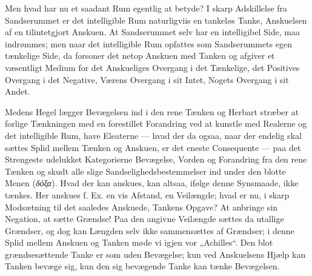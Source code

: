 \documentclass[11pt]{book}
\newcommand{\opage}[1]{\marginnote{\footnotesize\textit{[#1]}}}
\begin{document}
\opage{20} \setcounter{footnote}{0}%
Men hvad har nu et saadant Rum egentlig at betyde? I skarp
Adskillelse fra Sandserummet er det intelligible Rum naturligviis en
tankeløs Tanke, Anskuelsen af en tilintetgjort Anskuen. At
Sandserummet selv har en intelligibel Side, maa indrømmes; men naar
det intelligible Rum opfattes som Sandserummets egen tænkelige Side,
da forsoner det netop Anskuen med Tanken og afgiver et væsentligt
Medium for det Anskueliges Overgang i det Tænkelige, det Positives
Overgang i det Negative, Værens Overgang i sit Intet, Nogets Overgang
i sit Andet.

Medens Hegel lægger Bevægelsen ind i den rene Tænken og Herbart
stræber at forlige Tænkningen med en forestillet
\opage{21} \setcounter{footnote}{0}%
Forandring ved at kunstle med Realerne og det intelligible Rum, have
Eleaterne --- hvad der da ogsaa, naar der endelig skal sættes Splid
mellem Tænken og Anskuen, er det eneste Consequente --- paa det
Strengeste udelukket Kategorierne Bevægelse, Vorden og Forandring fra
den rene Tænken og skudt alle slige Sandselighedsbestemmelser ind
under den blotte Menen (\textit{δόξα}). Hvad der kan anskues, kan
altsaa, ifølge denne Synsmaade, ikke tænkes. Her anskues f. Ex. en
vis Afstand, en Veilængde; hvad er nu, i skarp Modsætning til det
saaledes Anskuede, Tankens Opgave? At anbringe sin Negation, at sætte
Grændse! Paa den angivne Veilængde sættes da utallige Grændser, og
dog kan Længden selv ikke sammensættes af Grændser; i denne Splid
mellem Anskuen og Tanken møde vi igjen vor „Achilles“. Den blot
grændsesættende Tanke er som uden Bevægelse; kun ved Anskuelsens
Hjælp kan Tanken bevæge sig, kun den sig bevægende Tanke kan tænke
Bevægelsen.
\end{document}
